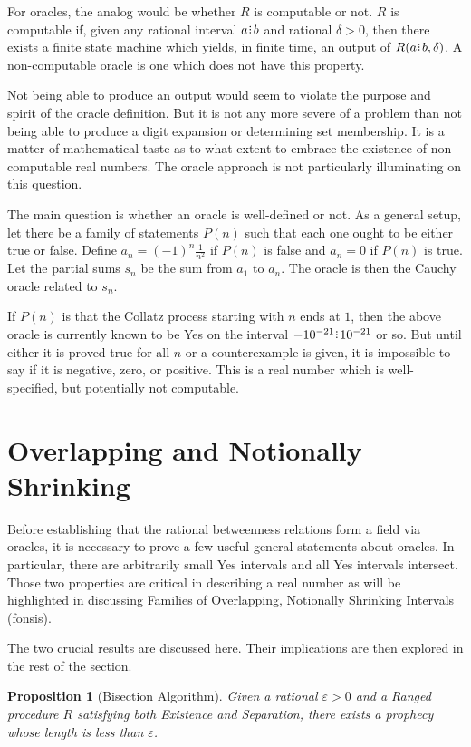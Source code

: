 \documentclass[12pt]{article}
\newtheorem{proposition}{Proposition}[section]
\begin{document}
For oracles, the analog would be whether $R$ is computable or not. $R$ is computable if, given any rational interval $a\rint b$ and rational $\delta > 0$, then there exists a finite state machine which yields, in finite time, an output of $R(a\rint b, \delta)$. A non-computable oracle is one which does not have this property. 

Not being able to produce an output would seem to violate the purpose and spirit of the oracle definition. But it is not any more severe of a problem than not being able to produce a digit expansion or determining set membership. It is a matter of mathematical taste as to what extent to embrace the existence of non-computable real numbers. The oracle approach is not particularly illuminating on this question. 

The main question is whether an oracle is well-defined or not. As a general setup, let there be a family of statements $P(n)$ such that each one ought to be either true or false. Define $a_n = (-1)^n \frac{1}{n^2}$ if $P(n)$ is false and $a_n = 0$ if $P(n)$ is true. Let the partial sums $s_n$ be the sum from $a_1$ to $a_n$. The oracle is then the Cauchy oracle related to $s_n$.

If $P(n)$ is that the Collatz process starting with $n$ ends at $1$, then the above oracle is currently known to be Yes on the interval $-10^{-21}\rint 10^{-21}$ or so. But until either it is proved true for all $n$ or a counterexample is given, it is impossible to say if it is negative, zero, or positive. This is a real number which is well-specified, but potentially not computable. 


\section{Overlapping and Notionally Shrinking}

Before establishing that the rational betweenness relations form a field via oracles, it is necessary to prove a few useful general statements about oracles. In particular, there are arbitrarily small Yes intervals and all Yes intervals intersect. Those two properties are critical in describing a real number as will be highlighted in discussing Families of Overlapping, Notionally Shrinking Intervals (fonsis). 

The two crucial results are discussed here. Their implications are then explored in the rest of the section. 

\begin{proposition}[Bisection Algorithm]
    Given a rational $\varepsilon >0$ and a Ranged procedure $R$ satisfying both Existence and Separation, there exists a prophecy whose length is less than $\varepsilon$.
\end{proposition}
\end{document}
